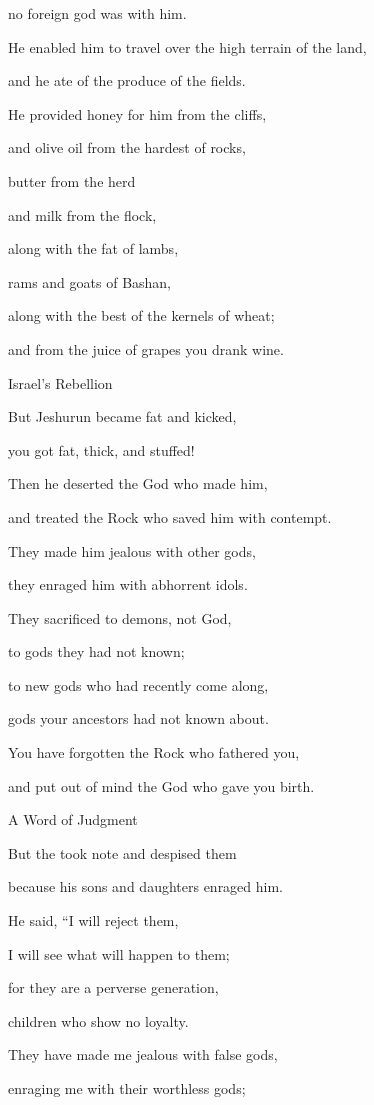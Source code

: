 {\par }{\Q no
foreign
god
was with him.
\par }{\Q {}He enabled
him to travel over
the high terrain
of the land,
\par }{\Q and he ate
of the produce
of the fields.
\par }{\Q He provided
honey
for him from the cliffs,
\par }{\Q and olive oil
from the hardest
of rocks,
\par }{\Q {}butter
from the herd
\par }{\Q and milk
from the flock,
\par }{\Q along with
the fat
of lambs,
\par }{\Q rams
and goats
of Bashan,
\par }{\Q along with
the best
of the kernels
of wheat;
\par }{\Q and from the juice
of grapes
you drank
wine.
\par }{\SH Israel’s Rebellion
\par }{\Q {}But Jeshurun
became fat
and kicked,
\par }{\Q you got fat,
thick,
and stuffed!
\par }{\Q Then he deserted
the God
who made
him,
\par }{\Q and treated
the Rock
who saved
him with contempt.
\par }{\Q {}They made him jealous
with other gods,
\par }{\Q they enraged
him with abhorrent idols.
\par }{\Q {}They sacrificed
to demons,
not
God,
\par }{\Q to gods
they had not
known;
\par }{\Q to new
gods who had recently
come along,
\par }{\Q gods your ancestors
had not
known about.
\par }{\Q {}You have forgotten
the Rock
who fathered
you,
\par }{\Q and put out of mind the God
who gave you birth.
\par }{\SH A Word of Judgment
\par }{\Q {}But
the {}
took
note
and despised
them
\par }{\Q because his sons
and daughters
enraged him.
\par }{\Q {}He said,
“I will reject
them,
\par }{\Q I will see
what
will happen
to them;
\par }{\Q for
they are
a perverse
generation,
\par }{\Q children
who show no
loyalty.
\par }{\Q {}They
have made me jealous
with false gods,
\par }{\Q enraging
me with their worthless
gods;

}
